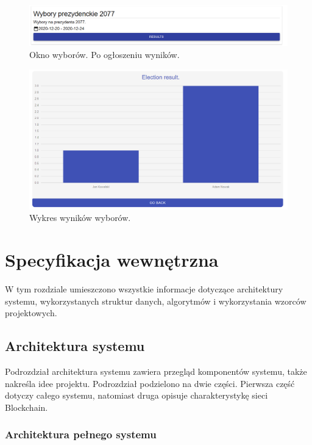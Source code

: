 \documentclass[a4paper,12pt]{book}
\begin{document}
\begin{figure}[H]
	\centering
	\includegraphics[width=\textwidth]{images/voterresults.png}
	\caption{Okno wyborów. Po ogłoszeniu wyników.}\label{voterresults}
\end {figure}

\begin{figure}[H]
	\centering
	\includegraphics[width=\textwidth]{images/resultdiagram.png}
	\caption{Wykres wyników wyborów.}\label{resultdiagram}
\end {figure}


\chapter{Specyfikacja wewnętrzna}

W tym rozdziale umieszczono wszystkie informacje dotyczące architektury systemu, wykorzystanych struktur danych, algorytmów i wykorzystania wzorców projektowych.
 
\section{Architektura systemu}
Podrozdział architektura systemu zawiera przegląd komponentów systemu, także nakreśla idee projektu. Podrozdział podzielono na dwie części. Pierwsza część dotyczy całego systemu, natomiast druga opisuje charakterystykę sieci Blockchain.
 
\subsection{Architektura pełnego systemu}
 
\end{document}
